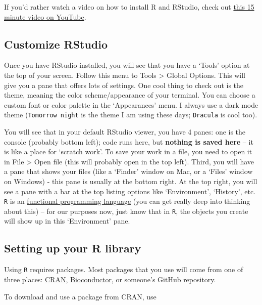 \documentclass[
]{book}
\begin{document}
If you'd rather watch a video on how to install R and RStudio, check out \href{https://www.youtube.com/watch?v=lVKMsaWju8w}{this 15 minute video on YouTube}.

\hypertarget{customize-rstudio}{%
\subsection{Customize RStudio}\label{customize-rstudio}}

Once you have RStudio installed, you will see that you have a `Tools' option at the top of your screen. Follow this menu to Tools \textgreater{} Global Options. This will give you a pane that offers lots of settings. One cool thing to check out is the theme, meaning the color scheme/appearance of your terminal. You can choose a custom font or color palette in the `Appearances' menu. I always use a dark mode theme (\texttt{Tomorrow\ night} is the theme I am using these days; \texttt{Dracula} is cool too).

You will see that in your default RStudio viewer, you have 4 panes: one is the console (probably bottom left); code runs here, but \textbf{nothing is saved here} -- it is like a place for `scratch work'. To save your work in a file, you need to open it in File \textgreater{} Open file (this will probably open in the top left). Third, you will have a pane that shows your files (like a `Finder' window on Mac, or a `Files' window on Windows) - this pane is usually at the bottom right. At the top right, you will see a pane with a bar at the top listing options like `Environment', `History', etc. \texttt{R} is an \href{https://en.wikipedia.org/wiki/Functional_programming}{functional programming language} (you can get really deep into thinking about this) -- for our purposes now, just know that in \texttt{R}, the objects you create will show up in this `Environment' pane.

\hypertarget{setting-up-your-r-library}{%
\subsection{Setting up your R library}\label{setting-up-your-r-library}}

Using \texttt{R} requires packages. Most packages that you use will come from one of three places: \href{https://cran.r-project.org/}{CRAN}, \href{https://www.bioconductor.org/}{Bioconductor}, or someone's GitHub repository.

To download and use a package from CRAN, use
\end{document}
